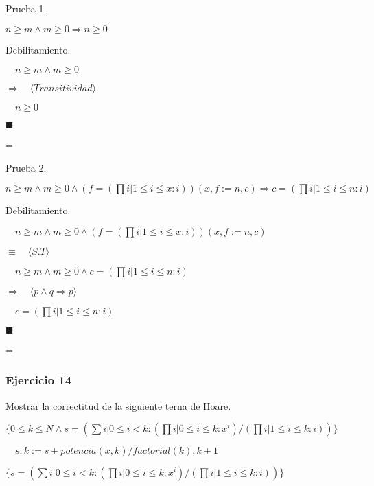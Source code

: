 \documentclass[hidelinks]{article}
\newenvironment{absolutelynopagebreak}
{\par\nobreak\vfil\penalty0\vfilneg
	\vtop\bgroup}
{\par\xdef\tpd{\the\prevdepth}\egroup
	\prevdepth=\tpd}
\begin{document}
\begin{absolutelynopagebreak}
	Prueba 1.\par
	$n \geq m \land m \geq 0 \Rightarrow n \geq 0$\par

	Debilitamiento.\par
	$\quad n \geq m \land m \geq 0$\par
	$\Rightarrow \quad \langle Transitividad \rangle$\par
	$\quad n \geq  0$\par
	$\blacksquare$\par
\end{absolutelynopagebreak}

\begin{absolutelynopagebreak}
	Prueba 2.\par
	$n \geq m \land m \geq 0 \land (f = (\prod i| 1 \leq i \leq x: i))(x,f := n,c) \Rightarrow c = (\prod i| 1 \leq i \leq n : i)$\par

	Debilitamiento.\par
	$\quad n \geq m \land m \geq 0 \land (f = (\prod i| 1 \leq i \leq x: i))(x,f := n,c)$\par
	$\equiv \quad \langle S.T \rangle$\par
	$\quad n \geq m \land m \geq 0 \land c = (\prod i| 1 \leq i \leq n: i)$\par
	$\Rightarrow \quad \langle p \land q \Rightarrow p \rangle$\par
	$\quad c = (\prod i| 1 \leq i \leq n: i)$\par
	$\blacksquare$\par
\end{absolutelynopagebreak}

\newpage

\subsubsection{Ejercicio 14}


Mostrar la correctitud de la siguiente terna de Hoare.\par

$\{0 \leq k \leq N \land s = (\sum i| 0 \leq i < k: (\prod i| 0 \leq i \leq k : x^i) / (\prod i| 1 \leq i \leq k : i))\}$ \par
$\quad s,k := s + potencia(x,k)/factorial(k), k + 1$ \par
$\{ s = (\sum i| 0 \leq i < k: (\prod i| 0 \leq i \leq k : x^i) / (\prod i| 1 \leq i \leq k : i))\}$ \par
\end{document}
